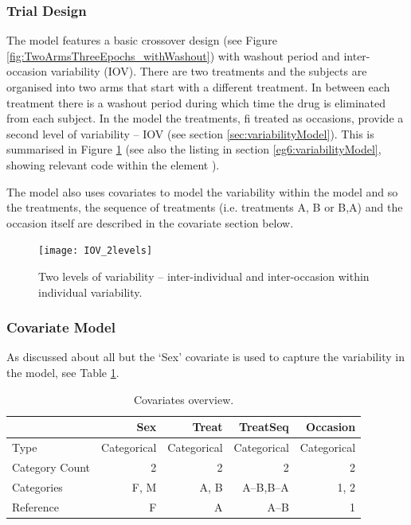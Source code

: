 \subsubsection{Trial Design}
The model features a basic crossover design (see Figure
\ref{fig:TwoArmsThreeEpochs_withWashout}) with washout period and inter-occasion
variability (IOV). There are two treatments and the subjects are
organised into two arms that start with a different treatment. In
between each treatment there is a washout period during which time the
drug is eliminated from each subject. 
In the model the treatments, fi treated as occasions, provide a second level of variability -- 
IOV  (see section \ref{sec:variabilityModel}).  
This is summarised in Figure \ref{fig:eg6-IOV_2levels} (see also the listing 
in section \ref{eg6:variabilityModel}, showing relevant code 
within the element ).

The model also uses covariates to model the variability within the
model and so the treatments, the sequence of treatments (i.e.\xspace treatments A, B or
B,A) and the occasion itself are described in the covariate section
below.

\begin{figure}[ht!]
\centering
 \texttt{[image: IOV\_2levels]}
\caption{Two levels of variability -- inter-individual and inter-occasion within individual variability.}
\label{fig:eg6-IOV_2levels}
\end{figure}


\subsubsection{Covariate Model}
\label{eg6:covariates-defn}

As discussed about all but the `Sex' covariate is used to capture the
variability in the model, see Table \ref{tab:CovariatesOverview}.

\begin{table}[h]
\begin{center}
\begin{tabular}{lrrrr}\toprule
 & \textbf{Sex} &{\color{red}\textbf{Treat}}&{\color{mediumgreen}\textbf{TreatSeq}}&{\color{magenta}\textbf{Occasion}}\\\midrule
Type & Categorical & Categorical & Categorical & Categorical  \\
Category Count & 2 & 2 & 2 & 2\\
Categories & F, M & A, B & A--B,B--A & 1, 2\\
Reference & F & A & A--B & 1\\
\bottomrule
\end{tabular}
\end{center}
\caption{Covariates overview.}
\label{tab:CovariatesOverview}
\end{table}

